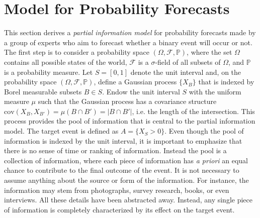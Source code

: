 \documentclass[11pt]{article}
\renewcommand{\P}{\mathbb{P}}
\theoremstyle{definition}
\theoremstyle{definition}
\begin{document}



\section{Model for Probability Forecasts}
\label{Model}
This section derives a \textit{partial information model} for probability forecasts made by a group of experts who aim to forecast whether a binary event will occur or not. The first step is to consider a probability space  $(\Omega, \mathcal{F}, \P)$, where the set $\Omega$ contains all possible states of the world,  $\mathcal{F}$ is a $\sigma$-field of all subsets of $\Omega$, and $\P$ is a probability measure. Let $S = [0,1]$ denote the unit interval and, on the probability space $(\Omega, \mathcal{F}, \P)$, define a Gaussian process $\{ X_B \}$ that is indexed by Borel measurable subsets $B \in S$. Endow the unit interval $S$ with the uniform measure $\mu$ such that the Gaussian process has a covariance structure $\text{cov}(X_B, X_{B'}) = \mu(B \cap B') = |B \cap B'|$, i.e. the length of the intersection. This process provides the pool of information that is central to the partial information model. The target event is defined as $A = \{ X_{S} > 0\}$. Even though the pool of information is indexed by the unit interval, it is important to emphasize that there is no sense of time or ranking of information. Instead the pool is a collection of information, where each piece of information has \textit{a priori} an equal chance to contribute to the final outcome of the event. It is not necessary to assume anything about the source or form of the information. For instance, the information may stem from photographs, survey research, books, or even interviews. All these details have been abstracted away. Instead, any single piece of information is completely characterized by its effect on the target event. 
\end{document}
